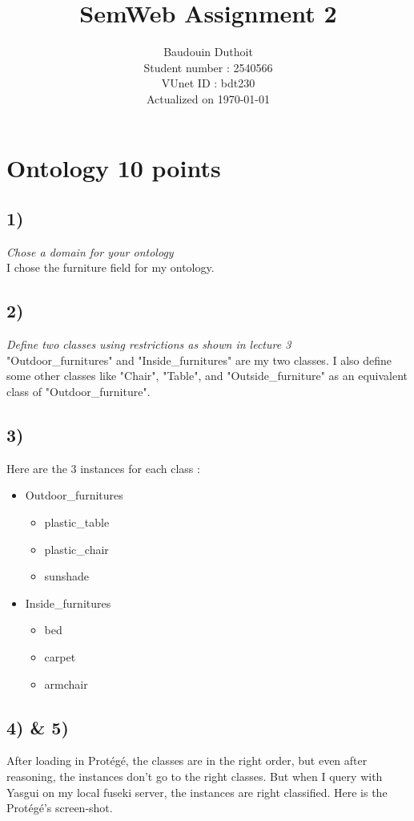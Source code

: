 \documentclass{article}
\newenvironment{itemh}[0]{\begin{itemize}[label=$\heartsuit$, font=\color{gray} \small]}{\end{itemize}}
\begin{document}
\title{SemWeb Assignment 2}
\author{Baudouin Duthoit\\
		Student number : 2540566\\
		VUnet ID : bdt230\\
		Actualized on \today}
\maketitle
\tableofcontents

\newpage
\section{Ontology 10 points}
	\subsection{1) }
		\textit{Chose a domain for your ontology}\\
		I chose the furniture field for my ontology.
	\subsection{2) }
		\textit{Define two classes using restrictions as shown in lecture 3}\\
		"Outdoor\_furnitures" and "Inside\_furnitures" are my two classes.
		I also define some other classes like "Chair", "Table", and "Outside\_furniture" as an equivalent class of "Outdoor\_furniture".
	\subsection{3) }
		Here are the 3 instances for each class :
		\begin{itemize}
			\item Outdoor\_furnitures
			\begin{itemh}
				\item plastic\_table
				\item plastic\_chair
				\item sunshade
			\end{itemh}
			\item Inside\_furnitures
			\begin{itemh}
				\item bed
				\item carpet
				\item armchair
			\end{itemh}
		\end{itemize}
	\subsection{4) \& 5)}
		After loading in Prot\'eg\'e, the classes are in the right order, but even
		after reasoning, the instances don't go to the right classes.
		But when I query with Yasgui on my local fuseki server, the instances are right classified.
		Here is the Prot\'eg\'e's screen-shot.
\end{document}
